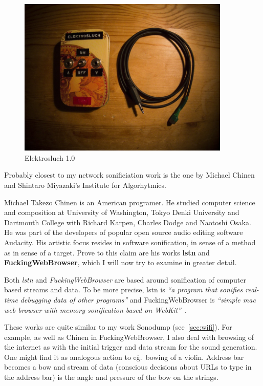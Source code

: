 \documentclass[12pt,a4paper,oneside]{report}
\begin{document}
\begin{figure}  
  \centering
    \includegraphics[width=0.9\textwidth]{img/elektrosluch}
	\caption{Elektrosluch 1.0}
	\label{fig:elektrosluch}
\end{figure}

Probably closest to my network sonificiation work is the one by Michael Chinen  and Shintaro Miyazaki's Institute for Algorhytmics. 

Michael Takezo Chinen is an American programer. He studied computer science and composition at University of Washington, Tokyo Denki University and Dartmouth College with Richard Karpen, Charles Dodge and Naotoshi Osaka. He was part of the developers of popular open source audio editing software Audacity. His artistic focus resides in software sonification, in sense of a method as in sense of a target. Prove to this claim are his works \textbf{lstn} and \textbf{FuckingWebBrowser}, which I will now try to examine in greater detail.~\cite{mchinen}

Both \emph{lstn} and \emph{FuckingWebBrowser} are based around sonification of computer based streams and data. To be more precise, lstn is \emph{``a program that sonifies real-time debugging data of other programs''} and FuckingWebBrowser is \emph{``simple mac web browser with memory sonification based on WebKit''}~\cite{Chinen2010, Chinen2010a}.

These works are quite similar to my work Sonodump (see~\ref{sec:wifi}). For example, as well as Chinen in FuckingWebBrowser, I also deal with browsing of the internet as with the initial trigger and data stream for the sound generation. One might find it as analogous action to e\.g.\, bowing of a violin. Address bar becomes a bow and stream of data (conscious decisions about URLs to type in the address bar) is the angle and pressure of the bow on the strings. 
\end{document}
